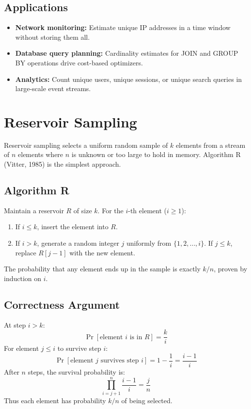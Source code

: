 \subsection{Applications}
\begin{itemize}
    \item \textbf{Network monitoring:} Estimate unique IP addresses in a time window without storing them all.
    \item \textbf{Database query planning:} Cardinality estimates for JOIN and GROUP BY operations drive cost-based optimizers.
    \item \textbf{Analytics:} Count unique users, unique sessions, or unique search queries in large-scale event streams.
\end{itemize}

\section{Reservoir Sampling}

Reservoir sampling selects a uniform random sample of $k$ elements from a stream of $n$ elements where $n$ is unknown or too large to hold in memory. Algorithm R (Vitter, 1985) is the simplest approach.

\subsection{Algorithm R}

Maintain a reservoir $R$ of size $k$. For the $i$-th element ($i \ge 1$):
\begin{enumerate}
    \item If $i \le k$, insert the element into $R$.
    \item If $i > k$, generate a random integer $j$ uniformly from $\{1, 2, \ldots, i\}$. If $j \le k$, replace $R[j-1]$ with the new element.
\end{enumerate}

The probability that any element ends up in the sample is exactly $k / n$, proven by induction on $i$.

\subsection{Correctness Argument}

At step $i > k$:
\[
\Pr[\text{element } i \text{ is in } R] = \frac{k}{i}
\]
For element $j \le i$ to survive step $i$:
\[
\Pr[\text{element } j \text{ survives step } i] = 1 - \frac{1}{i} = \frac{i-1}{i}
\]
After $n$ steps, the survival probability is:
\[
\prod_{i=j+1}^{n} \frac{i-1}{i} = \frac{j}{n}
\]
Thus each element has probability $k / n$ of being selected.

